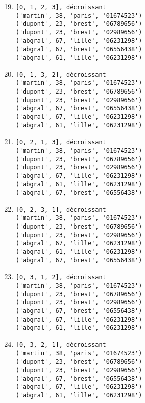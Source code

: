 \documentclass[11pt,a4paper]{article}
\begin{document}
\hfill
\begin{minipage}[t]{7cm}\footnotesize
\begin{enumerate}\setcounter{enumi}{18}
\item \begin{Verbatim}
[0, 1, 2, 3], décroissant
('martin', 38, 'paris', '01674523')
('dupont', 23, 'brest', '06789656')
('dupont', 23, 'brest', '02989656')
('abgral', 67, 'lille', '06231298')
('abgral', 67, 'brest', '06556438')
('abgral', 61, 'lille', '06231298')
\end{Verbatim}

\item \begin{Verbatim}
[0, 1, 3, 2], décroissant
('martin', 38, 'paris', '01674523')
('dupont', 23, 'brest', '06789656')
('dupont', 23, 'brest', '02989656')
('abgral', 67, 'brest', '06556438')
('abgral', 67, 'lille', '06231298')
('abgral', 61, 'lille', '06231298')
\end{Verbatim}

\item \begin{Verbatim}
[0, 2, 1, 3], décroissant
('martin', 38, 'paris', '01674523')
('dupont', 23, 'brest', '06789656')
('dupont', 23, 'brest', '02989656')
('abgral', 67, 'lille', '06231298')
('abgral', 61, 'lille', '06231298')
('abgral', 67, 'brest', '06556438')
\end{Verbatim}

\item \begin{Verbatim}
[0, 2, 3, 1], décroissant
('martin', 38, 'paris', '01674523')
('dupont', 23, 'brest', '06789656')
('dupont', 23, 'brest', '02989656')
('abgral', 67, 'lille', '06231298')
('abgral', 61, 'lille', '06231298')
('abgral', 67, 'brest', '06556438')
\end{Verbatim}

\item \begin{Verbatim}
[0, 3, 1, 2], décroissant
('martin', 38, 'paris', '01674523')
('dupont', 23, 'brest', '06789656')
('dupont', 23, 'brest', '02989656')
('abgral', 67, 'brest', '06556438')
('abgral', 67, 'lille', '06231298')
('abgral', 61, 'lille', '06231298')
\end{Verbatim}

\item \begin{Verbatim}
[0, 3, 2, 1], décroissant
('martin', 38, 'paris', '01674523')
('dupont', 23, 'brest', '06789656')
('dupont', 23, 'brest', '02989656')
('abgral', 67, 'brest', '06556438')
('abgral', 67, 'lille', '06231298')
('abgral', 61, 'lille', '06231298')
\end{Verbatim}
\end{enumerate}
\end{minipage}

\end{document}
